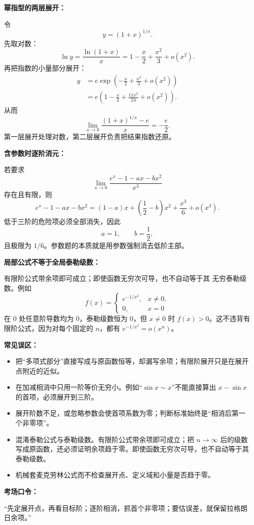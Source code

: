 \begin{knowledgeBox}
\textbf{幂指型的两层展开：}

令
\[
y=(1+x)^{1/x}.
\]
先取对数：
\[
\ln y
=\frac{\ln(1+x)}x
=1-\frac{x}{2}+\frac{x^2}{3}+o(x^2).
\]
再把指数的小量部分展开：
\[
\begin{aligned}
y
&=e\exp\left(-\frac{x}{2}+\frac{x^2}{3}+o(x^2)\right)\\
&=e\left(1-\frac{x}{2}+\frac{11x^2}{24}+o(x^2)\right).
\end{aligned}
\]
从而
\[
\lim_{x\to0}\frac{(1+x)^{1/x}-e}{x}
=-\frac e2.
\]
第一层展开处理对数，第二层展开负责把结果指数还原。

\textbf{含参数时逐阶消元：}

若要求
\[
\lim_{x\to0}
\frac{e^x-1-ax-bx^2}{x^3}
\]
存在且有限，则
\[
e^x-1-ax-bx^2
=(1-a)x+\left(\frac12-b\right)x^2
+\frac{x^3}{6}+o(x^3).
\]
低于三阶的危险项必须全部消失，因此
\[
a=1,\qquad b=\frac12,
\]
且极限为 \(1/6\)。参数题的本质就是用参数强制消去低阶主部。

\textbf{局部公式不等于全局泰勒级数：}

有限阶公式带余项即可成立；即使函数无穷次可导，也不自动等于其
无穷泰勒级数。例如
\[
f(x)=
\begin{cases}
e^{-1/x^2},&x\ne0,\\
0,&x=0
\end{cases}
\]
在 \(0\) 处任意阶导数均为 \(0\)，泰勒级数恒为 \(0\)，但
\(x\ne0\) 时 \(f(x)>0\)。这不违背有限阶公式，因为对每个固定的
\(n\)，都有 \(e^{-1/x^2}=o(x^n)\)。

\textbf{常见误区：}
\begin{itemize}
  \item 把“多项式部分”直接写成与原函数恒等，却漏写余项；有限阶展开只是在展开点附近的近似。
  \item 在加减相消中只用一阶等价无穷小。例如“\(\sin x\sim x\)”不能直接算出 \(x-\sin x\) 的首项，必须展开到三阶。
  \item 展开阶数不足，或忽略参数会使首项系数为零；判断标准始终是“相消后第一个非零项”。
  \item 混淆泰勒公式与泰勒级数。有限阶公式带余项即可成立；把 \(n\to\infty\) 后的级数写成原函数，还必须证明余项趋于零。即使函数无穷次可导，也不自动等于其泰勒级数。
  \item 机械套麦克劳林公式而不检查展开点、定义域和小量是否趋于零。
\end{itemize}

\textbf{考场口令：}

“先定展开点，再看目标阶；逐阶相消，抓首个非零项；要估误差，就保留拉格朗日余项。”
\end{knowledgeBox}
